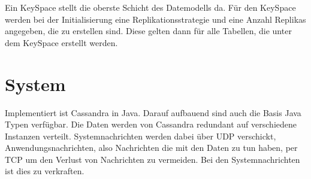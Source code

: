 Ein KeySpace stellt die oberste Schicht des Datemodells da. Für den KeySpace werden bei der Initialisierung eine Replikationsstrategie und eine Anzahl Replikas angegeben, die zu erstellen sind. Diese gelten dann für alle Tabellen, die unter dem KeySpace erstellt werden.

\section{System}
Implementiert ist Cassandra in Java. Darauf aufbauend sind auch die Basis Java Typen verfügbar. Die Daten werden von Cassandra redundant auf verschiedene Instanzen verteilt. Systemnachrichten werden dabei über UDP verschickt, Anwendungsnachrichten, also Nachrichten die mit den Daten zu tun haben, per TCP um den Verlust von Nachrichten zu vermeiden. Bei den Systemnachrichten ist dies zu verkraften.

